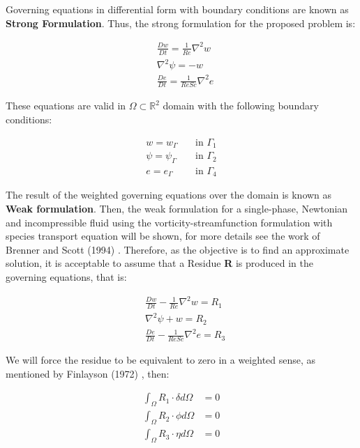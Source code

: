 Governing equations in differential form 
with boundary conditions are known as \textbf{Strong Formulation}. 
Thus, the strong formulation for the proposed problem is:

\begin{align}
& \frac{D w}{D t}
 =
 \frac{1}{Re} \nabla^{2} w
 \\[10pt] 
& \nabla^{2} \psi
 = 
 - 
 w \\[10pt]
& \frac{D e}{Dt}
 =
 \frac{1}{ReSc} \nabla^{2} e
\end{align}


\medskip
\noindent
These equations are valid in 
$\Omega \subset \mathbb{R}^2$ domain
with the following boundary conditions:

\begin{equation} \label{bc}
 \begin{aligned}
  w = w_\Gamma \quad & \mbox{in $\Gamma_1$}\\
  \psi = \psi_\Gamma \quad & \mbox{in $\Gamma_2$}\\
  e = e_\Gamma \quad & \mbox{in $\Gamma_4$}
\end{aligned}
\end{equation}

\vspace{1cm}
The result of the weighted governing equations over the domain 
is known as \textbf{Weak formulation}.
Then, the weak formulation 
for a single-phase, Newtonian and incompressible fluid using 
the vorticity-streamfunction formulation with species transport equation
will be shown, for more details see the work of Brenner and Scott (1994) 
\cite{brenner1994}. 
Therefore, as the objective is to find an approximate solution, 
it is acceptable to assume that a Residue \textbf{R} 
is produced in the governing equations, that is:


\begin{align}
& \frac{D w}{D t}
 -
 \frac{1}{Re} \nabla^{2} w
 = R_1 \\[10pt] 
& \nabla^{2} \psi
 + 
 w 
 = R_2 \\[10pt]
& \frac{D e}{Dt}
 -
 \frac{1}{ReSc} \nabla^{2} e
 = R_3
\end{align}

\medskip
We will force the residue to be equivalent to zero 
in a weighted sense, as mentioned by Finlayson (1972) \cite{finlayson1972}, then:

\begin{align}
 \int_{\Omega} R_1 \cdot \delta d\Omega &= 0 \\
 \int_{\Omega} R_2 \cdot \phi d\Omega &= 0 \\
 \int_{\Omega} R_3 \cdot \eta d\Omega &= 0
\end{align}



